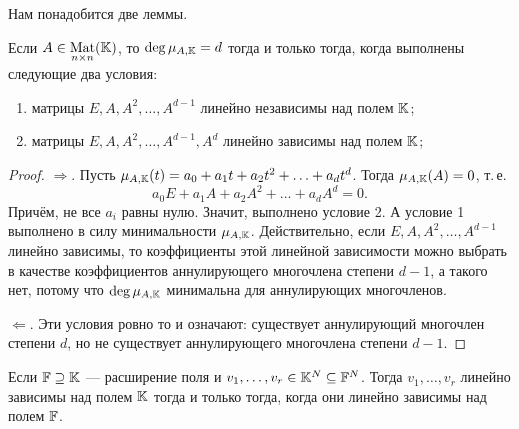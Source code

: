 Нам понадобится две леммы.

\begin{lemma}
    Если $A \in \underset{n \times n}{\operatorname{Mat}}(\mathbb{K})$, то $\deg\mu_{A, \mathbb{K}} = d$ тогда и только тогда, когда выполнены следующие два условия:
    \begin{enumerate}[nolistsep]
        \item матрицы $E, A, A^2, \ldots, A^{d - 1}$ линейно независимы над полем $\mathbb{K}$;
        \item матрицы $E, A, A^2, \ldots, A^{d - 1}, A^d$ линейно зависимы над полем $\mathbb{K}$;
    \end{enumerate}
\end{lemma}

\begin{proof}
    $\Rightarrow$. Пусть $\mu_{A, \mathbb{K}}(t) = a_0 + a_1t + a_2t^2 + \ldots + a_dt^d$. Тогда $\mu_{A, \mathbb{K}}(A) = 0$, т.\,е.
    \[
        a_0E + a_1A + a_2A^2 + \ldots + a_dA^d = 0.
    \]
    Причём, не все $a_i$ равны нулю. Значит, выполнено условие 2. А условие 1 выполнено в силу минимальности $\mu_{A, \mathbb{K}}$. Действительно, если $E, A, A^2, \ldots, A^{d - 1}$ линейно зависимы, то коэффициенты этой линейной зависимости можно выбрать в качестве коэффициентов аннулирующего многочлена степени $d - 1$, а такого нет, потому что $\deg\mu_{A, \mathbb{K}}$ минимальна для аннулирующих многочленов.

    $\Leftarrow$. Эти условия ровно то и означают: существует аннулирующий многочлен степени $d$, но не существует аннулирующего многочлена степени $d - 1$.
\end{proof}

\begin{lemma}
    Если $\mathbb{F} \supseteq \mathbb{K}$ --- расширение поля и $v_1, \ldots, v_r \in \mathbb{K}^N \subseteq \mathbb{F}^N$. Тогда $v_1, \ldots, v_r$ линейно зависимы над полем $\mathbb{K}$ тогда и только тогда, когда они линейно зависимы над полем $\mathbb{F}$.
\end{lemma}

